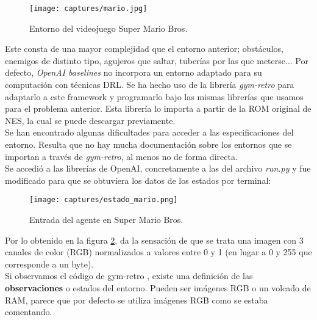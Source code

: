 \documentclass[11pt,fleqn]{book} %
\begin{document}
\begin{figure}[H]
	\centering\texttt{[image: captures/mario.jpg]}
	\caption{Entorno del videojuego Super Mario Bros.}
	\label{fig:mario} %
\end{figure}

Este consta de una mayor complejidad que el entorno anterior; obstáculos, enemigos de distinto tipo, agujeros que saltar, tuberías por las que meterse... Por defecto, \textit{OpenAI baselines} no incorpora un entorno adaptado para su computación con técnicas DRL. Se ha hecho uso de la librería \textit{gym-retro}\cite{article:gymretro} para adaptarlo a este framework y programarlo bajo las mismas librerías que usamos para el problema anterior. Esta librería lo importa a partir de la ROM original de NES, la cual se puede descargar previamente. \\

Se han encontrado algunas dificultades para acceder a las especificaciones del entorno. Resulta que no hay mucha documentación sobre los entornos que se importan a través de \textit{gym-retro}, al menos no de forma directa. \\

Se accedió a las librerías de OpenAI, concretamente a las del archivo \textit{run.py} y fue modificado para que se obtuviera los datos de los estados por terminal:

\begin{figure}[H]
	\centering\texttt{[image: captures/estado\_mario.png]}
	\caption{Entrada del agente en Super Mario Bros.}
	\label{fig:entradamario} %
\end{figure}

Por lo obtenido en la figura \ref{fig:entradamario}, da la sensación de que se trata una imagen con 3 canales de color (RGB) normalizados a valores entre 0 y 1 (en lugar a 0 y 255 que corresponde a un byte). \\

Si observamos el código de gym-retro \cite{article:retroobservations}, existe una definición de las \textbf{observaciones} o estados del entorno. Pueden ser imágenes RGB o un volcado de RAM, parece que por defecto se utiliza imágenes RGB como se estaba comentando. \\
\end{document}
